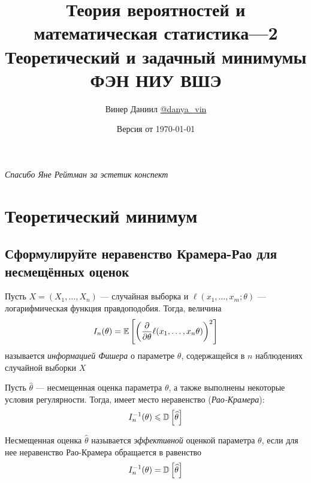 \documentclass{article}
\title{\LARGE{Теория вероятностей и математическая статистика—2}\\
Теоретический и задачный минимумы\\
ФЭН НИУ ВШЭ}
\author{Винер Даниил  \href{https://t.me/danya_vin}{@danya\_vin}}
\date{Версия от \today}
\begin{document}
\maketitle
\begin{flushright}
    \textit{Спасибо Яне Рейтман за эстетик конспект}
\end{flushright}
\tableofcontents
\newpage
\setlength{\parindent}{15pt}
\setlength{\parskip}{2mm}
\section{Теоретический минимум}

\subsection{Сформулируйте неравенство Крамера-Рао для несмещённых оценок}
 Пусть $X=(X_1,\ldots,X_n)$ — случайная выборка и $\ell(x_1,\ldots,x_m;\theta)$ — логарифмическая функция правдоподобия. Тогда, величина 
\begin{equation*}
    I_n(\theta)=\mathbb{E}\left[\left(\frac{\partial}{\partial\theta}\ell(x_1,\ldots,x_n\theta)\right)^2\right]
\end{equation*}
называется \textit{информацией Фишера} о параметре $\theta$, содержащейся в $n$ наблюдениях случайной выборки $X$

\theorem Пусть $\widehat{\theta}$ — несмещенная оценка параметра $\theta$, а также выполнены некоторые условия регулярности. Тогда, имеет место неравенство (\textit{Рао-Крамера}):
\begin{equation*}
    I_n^{-1}(\theta)\leqslant \mathbb{D}\left[\widehat{\theta}\right]
\end{equation*}

 Несмещенная оценка $\widehat{\theta}$ называется \textit{эффективной} оценкой параметра $\theta$, если для нее неравенство Рао-Крамера обращается в равенство
\begin{equation*}
    I_n^{-1}(\theta)= \mathbb{D}\left[\widehat{\theta}\right]
\end{equation*} 
\end{document}
